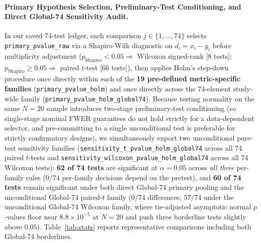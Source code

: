 \documentclass[10pt,letterpaper]{article}
\begin{document}
\paragraph{Primary Hypothesis Selection, Preliminary-Test Conditioning, and Direct Global-74 Sensitivity Audit.}
In our saved 74-test ledger, each comparison $j \in \{1,\dots,74\}$ selects \texttt{primary\_\allowbreak pvalue\_\allowbreak raw} via a Shapiro-Wilk diagnostic on $d_i = x_i - y_i$ before multiplicity adjustment ($p_{\mathrm{Shapiro}} < 0.05 \Rightarrow$ Wilcoxon signed-rank [$8$ tests]; $p_{\mathrm{Shapiro}} \ge 0.05 \Rightarrow$ paired $t$-test [$66$ tests]), then applies Holm's step-down procedure \cite{holm1979simple} once directly within each of the \textbf{19 pre-defined metric-specific families} (\texttt{primary\_\allowbreak pvalue\_\allowbreak holm}) and once directly across the 74-element study-wide family (\texttt{primary\_\allowbreak pvalue\_\allowbreak holm\_\allowbreak global74}). Because testing normality on the same $N=20$ sample introduces two-stage preliminary-test conditioning (so single-stage nominal FWER guarantees do not hold strictly for a data-dependent selector, and pre-committing to a single unconditional test is preferable for strictly confirmatory designs), we simultaneously export two unconditional pure-test sensitivity families (\texttt{sensitivity\_\allowbreak t\_\allowbreak pvalue\_\allowbreak holm\_\allowbreak global74} across all 74 paired $t$-tests and \texttt{sensitivity\_\allowbreak wilcoxon\_\allowbreak pvalue\_\allowbreak holm\_\allowbreak global74} across all 74 Wilcoxon tests): \textbf{62 of 74 tests} are significant at $\alpha=0.05$ across \emph{all three} per-family rules ($0/74$ per-family decisions depend on the pretest), and \textbf{60 of 74 tests} remain significant under both direct Global-74 primary pooling and the unconditional Global-74 paired-$t$ family ($0/74$ differences; $57/74$ under the unconditional Global-74 Wilcoxon family, where tie-adjusted asymptotic normal $p$-values floor near $8.8 \times 10^{-5}$ at $N=20$ and push three borderline tests slightly above $0.05$). Table~\ref{tab:stats} reports representative comparisons including both Global-74 borderlines.
\end{document}
